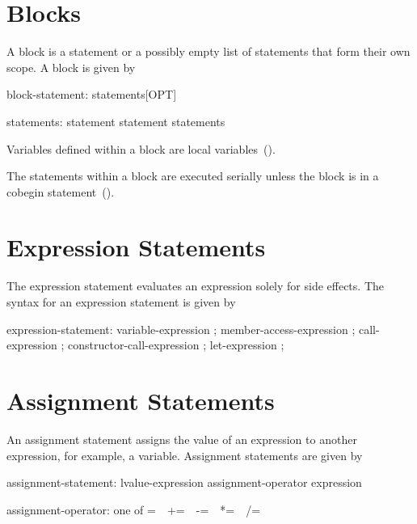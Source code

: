 \section{Blocks}
\label{Blocks}

A block is a statement or a possibly empty list of statements that
form their own scope.  A block is given by
\begin{syntax}
block-statement:
  { statements[OPT] }

statements:
  statement
  statement statements
\end{syntax}

Variables defined within a block are local
variables~().

The statements within a block are executed serially unless the block
is in a cobegin statement~().

\section{Expression Statements}
\label{Expression_Statements}
The expression statement evaluates an expression solely for side
effects. The syntax for an expression statement is given by
\begin{syntax}
expression-statement:
  variable-expression ;
  member-access-expression ;
  call-expression ;
  constructor-call-expression ;
  let-expression ;
\end{syntax}

\section{Assignment Statements}
\label{Assignment_Statements}

An assignment statement assigns the value of an expression to another
expression, for
example, a variable.  Assignment statements are given by

\begin{syntax}
assignment-statement:
  lvalue-expression assignment-operator expression

assignment-operator: one of
   = $ $ $ $ += $ $ $ $ -= $ $ $ $ *= $ $ $ $ /= $ $ $ $ %
\end{syntax}


